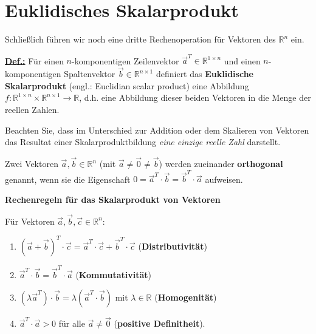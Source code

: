 \section[Euklidisches Skalarprodukt]%
{Euklidisches Skalarprodukt}
Schlie\ss lich f\"uhren wir noch eine dritte Rechenoperation f\"ur
Vektoren des $\mathbb{R}^{n}$ ein.

\medskip
\noindent
\underline{\bf Def.:} F\"ur einen $n$-komponentigen Zeilenvektor
$\vec{a}^{T} \in \mathbb{R}^{1 \times n}$ und einen
$n$-komponentigen Spaltenvektor $\vec{b} \in
\mathbb{R}^{n \times 1}$ definiert das {\bf Euklidische
Skalarprodukt} (engl.: Euclidian scalar product)
%
\be
{}
\ee
%
eine Abbildung $f: \mathbb{R}^{1 \times n}\times
\mathbb{R}^{n \times 1} \rightarrow \mathbb{R}$, d.h. eine
Abbildung dieser beiden Vektoren in die Menge der reellen
Zahlen.

\medskip
\noindent
Beachten Sie, dass im Unterschied zur Addition oder dem Skalieren
von Vektoren das Resultat einer Skalarproduktbildung {\em eine
einzige reelle Zahl\/} darstellt.

\medskip
\noindent
Zwei Vektoren $\vec{a}, \vec{b} \in {\mathbb R}^{n}$ (mit $\vec{a}
\neq \vec{0} \neq \vec{b}$) werden zueinander {\bf orthogonal}
genannt, wenn sie die Eigenschaft
$0 = \vec{a}^{T}\cdot\vec{b} = \vec{b}^{T}\cdot\vec{a}$
aufweisen.

\medskip
\noindent
{\bf Rechenregeln f\"ur das Skalarprodukt von Vektoren}

\noindent
F\"ur Vektoren
$\vec{a}, \vec{b}, \vec{c} \in {\mathbb R}^{n}$:

\begin{enumerate}
	\item $(\vec{a}+\vec{b})^{T}\cdot\vec{c}
	= \vec{a}^{T}\cdot\vec{c}+\vec{b}^{T}\cdot\vec{c}$
	\hfill ({\bf Distributivit\"at})
	\item $\vec{a}^{T}\cdot\vec{b} = \vec{b}^{T}\cdot\vec{a}$
	\hfill ({\bf Kommutativit\"at})
	\item $(\lambda\vec{a}^{T})\cdot\vec{b} =
	\lambda(\vec{a}^{T}\cdot\vec{b})$ mit $\lambda \in {\mathbb R}$
	\hfill ({\bf Homogenit\"at})
	\item $\vec{a}^{T}\cdot\vec{a} > 0$ f\"ur alle $\vec{a}
	\neq \vec{0}$ \hfill ({\bf positive Definitheit}).
\end{enumerate}

